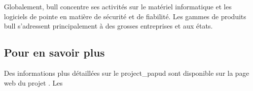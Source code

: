Globalement, \gls{bull} concentre ses activités sur le matériel informatique et les logiciels de pointe en matière de sécurité et de fiabilité.
Les gammes de produits \gls{bull} s'adressent principalement à des grosses entreprises et aux états.

\subsection*{Pour en savoir plus}
Des informations plus détaillées sur le \gls{project_papud} sont disponible sur la page web du projet .
Les %
